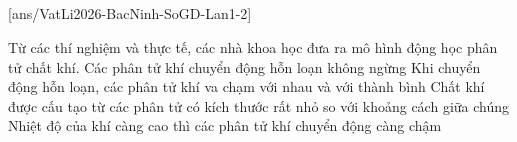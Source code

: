 	\subsection*{}
	\setcounter{ex}{0}
	[ans/VatLi2026-BacNinh-SoGD-Lan1-2]

	\begin{ex}%
		Từ các thí nghiệm và thực tế, các nhà khoa học đưa ra mô hình động học phân tử chất khí.
		\choiceTFt
		{\True Các phân tử khí chuyển động hỗn loạn không ngừng}
		{\True Khi chuyển động hỗn loạn, các phân tử khí va chạm với nhau và với thành bình}
		{\True Chất khí được cấu tạo từ các phân tử có kích thước rất nhỏ so với khoảng cách giữa chúng}
		{Nhiệt độ của khí càng cao thì các phân tử khí chuyển động càng chậm}
	\end{ex}

